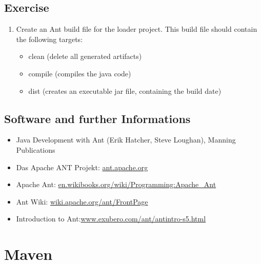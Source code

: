 \subsection{Exercise}
\begin{enumerate}
\item Create an Ant build file for the loader project. This build file
should contain the following targets:
\begin{itemize}
\item clean (delete all generated artifacts)
\item compile (compiles the java code)
\item dist (creates an executable jar file, containing the build date)
\end{itemize}

\end{enumerate}
%
\newslide
\subsection{Software and further Informations}
\begin{itemize}
\item Java Development with Ant (Erik Hatcher, Steve Loughan), Manning
  Publications
\item Das Apache ANT Projekt:
  \href{http://ant.apache.org}{ant.apache.org}
\item Apache Ant:
  \href{http://en.wikibooks.org/wiki/Programming:Apache_Ant}
     {en.wikibooks.org/wiki/Programming:Apache\_Ant}
\item Ant Wiki:
  \href{http://wiki.apache.org/ant/FrontPage}{wiki.apache.org/ant/FrontPage}
\item Introduction to
  Ant:\href{http://www.exubero.com/ant/antintro-s5.html}
{www.exubero.com/ant/antintro-s5.html}
\end{itemize}
%
\newslide
%
%

\newpage

\section{Maven}

